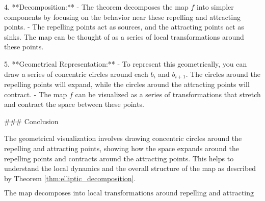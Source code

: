 4. **Decomposition:**
   - The theorem decomposes the map \( f \) into simpler components by focusing on the behavior near these repelling and attracting points.
   - The repelling points act as sources, and the attracting points act as sinks. The map can be thought of as a series of local transformations around these points.

5. **Geometrical Representation:**
   - To represent this geometrically, you can draw a series of concentric circles around each \( b_i \) and \( b_{i+1} \). The circles around the repelling points will expand, while the circles around the attracting points will contract.
   - The map \( f \) can be visualized as a series of transformations that stretch and contract the space between these points.

### Conclusion

The geometrical visualization involves drawing concentric circles around the repelling and attracting points, showing how the space expands around the repelling points and contracts around the attracting points. This helps to understand the local dynamics and the overall structure of the map as described by Theorem \ref{thm:elliptic_decomposition}.

\[
\boxed{\text{The map decomposes into local transformations around repelling and attracting points, visualized by expanding and contracting circles around these points.}}
\]